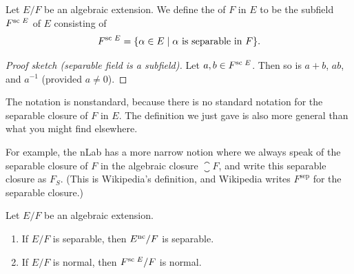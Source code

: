 
\lecture{}

\begin{definition}
Let $E/F$ be an algebraic extension. We define the 
of $F$ in $E$ to be the subfield $\separableclosure{F}{E}$ of $E$
consisting of
\begin{equation}
\separableclosure{F}{E}=\{\alpha\in E\mid\alpha\mbox{ is separable in }F\}.
\end{equation}
\end{definition}
\begin{proof}[Proof sketch (separable field is a subfield)]
Let $a,b\in\separableclosure{F}{E}$. Then so is $a+b$, $ab$, and
$a^{-1}$ (provided $a\neq0$).
\end{proof}

\begin{remark}
The notation is nonstandard, because there is no standard notation for
the separable closure of $F$ in $E$. The definition we just gave is
also more general than what you might find elsewhere.

For example, the nLab has a more narrow notion where we always speak
of the separable closure of $F$ in the algebraic closure
$\closure{F}$, and write this separable closure as $F_{S}$. (This is
Wikipedia's definition, and Wikipedia writes $F^{\text{sep}}$ for the
separable closure.)
\end{remark}

\begin{proposition}\label{prop:4.6}
Let $E/F$ be an algebraic extension.
\begin{enumerate}
\item If $E/F$ is separable, then $E^{\text{nc}}/F$ is separable.
\item\label{item:4.6:2} If $E/F$ is normal, then $\separableclosure{F}{E}/F$ is normal.
\end{enumerate}
\end{proposition}

